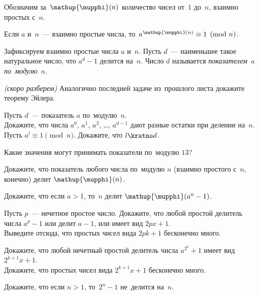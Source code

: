 


\begingroup
    \ifdefined\mathup
        \providecommand\eulerphi{\mathup{\mupphi}}\fi
    \ifdefined\upphi
        \providecommand\eulerphi{\upphi}\fi
    \providecommand\eulerphi{\phi}%

Обозначим за~$\eulerphi(n)$ количество чисел от~$1$ до~$n$, взаимно простых
с~$n$.

Если $a$ и~$n$~--- взаимно простые числа,
то~$a^{\eulerphi(n)} \equiv 1 \pmod n$.

Зафиксируем взаимно простые числа $a$ и~$n$.
Пусть $d$~--- наименьшее такое натуральное число, что $a^{d} - 1$ делится
на~$n$.
Число $d$ называется \emph{показателем~$a$ по~модулю~$n$}.

\begin{problems}

\emph{(скоро разберем)}\enspace
Аналогично последней задаче из~прошлого листа докажите теорему Эйлера.

\item{}
Пусть $d$~--- показатель $a$ по~модулю~$n$.
\\
\subproblem
Докажите, что числа $a^0$, $a^1$, $a^2$, \ldots, $a^{d-1}$ дают разные остатки
при делении на~$n$.
\\
\subproblem
Пусть $a^l \equiv 1 \pmod{n}$.
Докажите, что $l \kratno d$.

\item
Какие значения могут принимать показатели по~модулю $13$?

\item
Докажите, что показатель любого числа по~модулю $n$ (взаимно простого с~$n$,
конечно) делит $\eulerphi(n)$.

\item
Докажите, что если $a > 1$, то~$n$ делит $\eulerphi(a^{n} - 1)$.

\item
\subproblem
Пусть $p$~--- нечетное простое число.
Докажите, что любой простой делитель числа $a^{p} - 1$ или делит $a - 1$, или
имеет вид $2 p x + 1$.
\\
\subproblem
Выведите отсюда, что простых чисел вида $2 p k + 1$ бесконечно много.

\item
\subproblem
Докажите, что любой нечетный простой делитель числа $a^{2^{k}} + 1$ имеет вид
$2^{k+1} x + 1$.
\\
\subproblem
Докажите, что простых чисел вида $2^{k+1} x + 1$ бесконечно много.

\item
Докажите, что если $n > 1$, то~$2^{n} - 1$ не~делится на~$n$.

\end{problems}

\endgroup %

